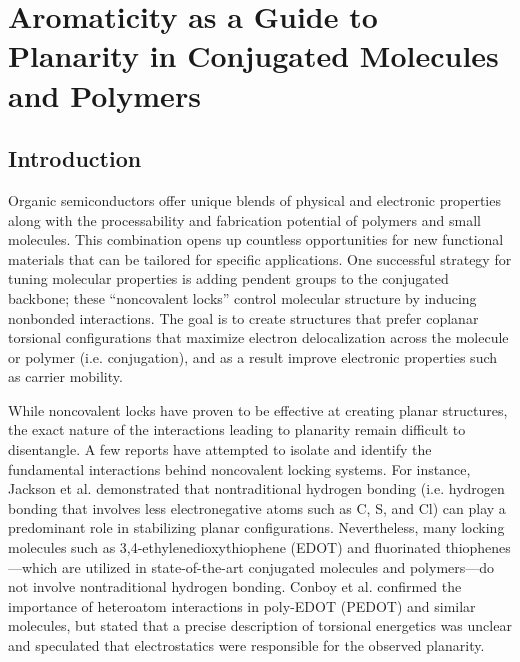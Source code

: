 \chapter{Aromaticity as a Guide to Planarity in Conjugated Molecules and Polymers}

\section{Introduction}

Organic semiconductors offer unique blends of physical and electronic properties along with the processability and fabrication potential of polymers and small molecules.\cite{Kuei2017, Swager2017} This combination opens up countless opportunities for new functional materials that can be tailored for specific applications.\cite{Mei2013, Muench2016, Someya2016, VanDeBurgt2018} One successful strategy for tuning molecular properties is adding pendent groups to the conjugated backbone; these ``noncovalent locks'' control molecular structure by inducing nonbonded interactions.\cite{Jackson2013, Cheng2016, Conboy2016, Huang2017} 
The goal is to create structures that prefer coplanar torsional configurations that maximize electron delocalization across the molecule or polymer (i.e. conjugation), and as a result improve electronic properties such as carrier mobility. 

While noncovalent locks have proven to be effective at creating planar structures, the exact nature of the interactions leading to planarity remain difficult to disentangle. A few reports have attempted to isolate and identify the fundamental interactions behind  noncovalent locking systems. For instance, Jackson et al. demonstrated that nontraditional hydrogen bonding (i.e. hydrogen bonding that involves less electronegative atoms such as C, S, and Cl) can play a predominant role in stabilizing planar configurations.\cite{Jackson2013} Nevertheless, many locking molecules such as 3,4-ethylenedioxythiophene (EDOT) and fluorinated thiophenes---which are utilized in state-of-the-art conjugated molecules and polymers\cite{Yum2014, Granstrom1995, Wijsboom2011, Gao2015, Gao2018, Jo2014, Li2015}---do not involve nontraditional hydrogen bonding. Conboy et al. confirmed the importance of heteroatom interactions in poly-EDOT (PEDOT) and similar molecules, but stated that a precise description of torsional energetics was unclear and speculated that electrostatics were responsible for the observed planarity.\cite{Conboy2016} 

